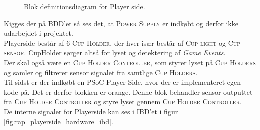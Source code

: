\documentclass[Rapport/Rapport_main.tex]{subfiles}
\begin{document}
\begin{figure}[H]
    \centering
    \caption{Blok definitionsdiagram for Player side.}
    \label{fig:rap_playerside_hardware_bdd}
\end{figure}
Kigges der på BDD'et så ses det, at \textsc{Power Supply} er indkøbt og derfor ikke udarbejdet i projektet.\\
Playerside består af 6 \textsc{Cup Holder}, der hver især består af \textsc{Cup light} og \textsc{Cup sensor}. CupHolder sørger altså for lyset og detektering af \textit{Game Events}.\\ 
Der skal også være en \textsc{Cup Holder Controller}, som styrer lyset på \textsc{Cup Holders} og samler og filtrerer sensor signalet fra samtlige \textsc{Cup Holders}. \\ 
Til sidst er der indkøbt en PSoC Player Side, hvor der er implementeret egen kode på. Det er derfor blokken er orange. Denne blok behandler sensor outputtet fra \textsc{Cup Holder Controller} og styre lyset gennem \textsc{Cup Holder Controller}.\\
De interne signaler for Playerside kan ses i IBD'et i figur \ref{fig:rap_playerside_hardware_ibd}.
\end{document}
